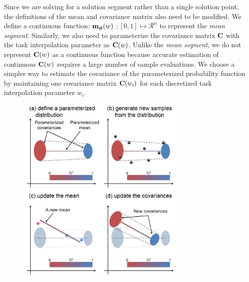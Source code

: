 Since we are solving for a solution segment rather than a single
solution point, 
the definitions of the mean and covariance matrix also need to be
modified. We define a continuous function: $\mathbf{m}_{\boldsymbol{\phi}}(w)$
$: [0, 1] \mapsto \mathcal{R}^n$ to represent the \emph{mean
  segment}. Similarly, we also need to parameterize the covariance matrix
$\mathbf{C}$ with the task interpolation parameter as
$\mathbf{C}(w)$.
Unlike the \emph{mean segment}, we do not represent $\mathbf{C}(w)$ as
a continuous function because accurate estimation of
continuous $\mathbf{C}(w)$ requires a large number of sample evaluations. We
choose a simpler way to estimate the covariance of the 
parameterized probability function by maintaining one covariance matrix $\mathbf{C}(w_i)$
for each discretized task interpolation parameter $w_i$.

\begin{figure}[t]
\center
  \includegraphics[width=0.75\textwidth]{images/steps}
  \caption{
  }
  \label{fig:optskills_steps}
\end{figure}

